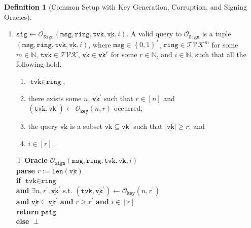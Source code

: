 \documentclass[11pt]{article}
\theoremstyle{definition}
\newtheorem{definition}[definition]{Definition}
\newcommand{\tvk}{\texttt{tvk}}
\newcommand{\ring}{\texttt{ring}}
\newcommand{\VK}{\underline{\texttt{vk}}}
\newcommand{\sig}{\texttt{sig}}
\newcommand{\psig}{\texttt{psig}}
\newcommand{\bitstrings}{\left\{0,1\right\}^*}
\newcommand{\bbn}{\mathbb{N}}
\newcommand{\msg}{\texttt{msg}}
\newcommand{\sign}{\texttt{Sign}}
\newcommand{\signingOracle}{\mathcal{O}_{\sign}}
\newcommand{\keyOracle}{\mathcal{O}_{\texttt{key}}}
\begin{document}
\begin{definition}[Common Setup with Key Generation, Corruption, and Signing Oracles]
\begin{enumerate}
\begin{enumerate}
\begin{oracle}
\begin{tabular}{|l|}
        \hline
        \end{tabular}
\caption{The corruption oracle in the game of common setup.}
\label{oracle:corrupt}
\end{oracle}




\item $\sig \leftarrow \signingOracle(\msg, \ring, \tvk, \VK, i).$ A valid query to $\signingOracle$ is a tuple $(\msg, \ring, \tvk, \VK, i)$, where $\msg \in \bitstrings$, $\ring \in \mathcal{TVK}^m$ for some $m \in \bbn$, $\tvk \in \mathcal{TVK}$, $\VK \in \VK^r$ for some $r \in \bbn$, and $i \in \bbn$, such that all the following hold.
\begin{enumerate}
\item $\tvk \in \ring$,
\item there exists some $n$, $\VK^\prime$ such that $r \in [n]$ and $(\tvk, \VK^\prime) \leftarrow \keyOracle(n,r)$ occurred,
\item the query $\VK$ is a subset $\VK \subseteq \VK^\prime$ such that $\left|\VK\right| \geq r$, and
\item $i \in [r]$.
\end{enumerate}

\begin{oracle}
    \centering
        \begin{tabular}{|l|}
        \hline
          {\textbf{Oracle} $\signingOracle(\msg, \ring, \tvk, \VK, i)$} \\
        \hline 
        \textbf{parse} $r:=\texttt{len}(\VK)$ \\
        \textbf{if} $\tvk \in \ring$ \\ 
        \textbf{and} $\exists n,r^\prime,\VK^\prime$ s.t. $(\tvk, \VK^\prime) \leftarrow \keyOracle(n,r^\prime)$ \\ 
        \textbf{and} $\VK \subseteq \VK^\prime$ \textbf{and} $r \geq r^\prime$ \textbf{ and } $i \in [r]$ \\
        \quad \quad \textbf{return} $\psig$ \\
        \textbf{else} $\perp$ \\
        \hline
        \end{tabular}
\caption{The signing oracle}
\label{oracle:sign}
\end{oracle}


\end{enumerate}
\end{enumerate}
\end{definition}
\end{document}
